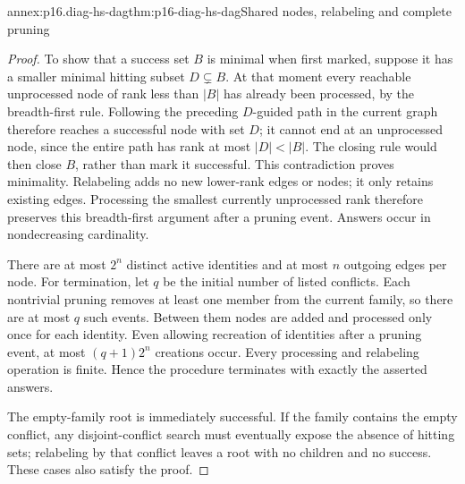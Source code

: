 \begin{annexitem}{annex:p16.diag-hs-dag}{thm:p16-diag-hs-dag}{Shared nodes, relabeling and complete pruning}
\begin{proof}
To show that a success set \(B\) is minimal when first
marked, suppose it has a smaller minimal hitting subset
\(D\subsetneq B\). At that moment every reachable
unprocessed node of rank less than \(|B|\) has already
been processed, by the breadth-first rule. Following
the preceding \(D\)-guided path in the current graph
therefore reaches a successful node with set \(D\);
it cannot end at an unprocessed node, since the entire
path has rank at most \(|D|<|B|\).
The closing rule would then close \(B\), rather than
mark it successful. This contradiction proves minimality.
Relabeling adds no new lower-rank edges or nodes; it only
retains existing edges. Processing the smallest currently
unprocessed rank therefore preserves this breadth-first
argument after a pruning event. Answers occur in
nondecreasing cardinality.

There are at most \(2^n\) distinct active identities and
at most \(n\) outgoing edges per node. For termination,
let \(q\) be the initial number of listed conflicts.
Each nontrivial pruning removes at least one member
from the current family, so there are at most \(q\)
such events. Between them nodes are added and processed
only once for each identity. Even allowing recreation
of identities after a pruning event, at most
\((q+1)2^n\) creations occur. Every processing and
relabeling operation is finite. Hence the procedure
terminates with exactly the asserted answers.

The empty-family root is immediately successful.
If the family contains the empty conflict, any
disjoint-conflict search must eventually expose the
absence of hitting sets; relabeling by that conflict
leaves a root with no children and no success.
These cases also satisfy the proof.
\end{proof}
\end{annexitem}

